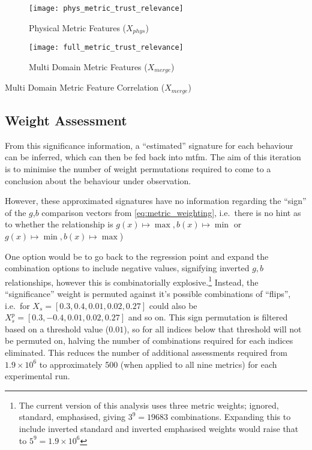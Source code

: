 \begin{figure}[h!]
  \centering
  \texttt{[image: phys\_metric\_trust\_relevance]}
  \caption{Physical Metric Features ($X_{phys}$)}
  \label{fig:phys_feature_extraction}
\end{figure}

\begin{figure}[h!]
  \centering
  \texttt{[image: full\_metric\_trust\_relevance]}
  \caption{Multi Domain  Metric Features ($X_{merge}$)}
  \label{fig:multi_feature_extraction}
\end{figure}

\begin{table}
  \centering
  \caption{Multi Domain Metric Feature Correlation ($X_{merge}$)}
  
  \label{tab:full_metric_correlations}
\end{table}



\subsection{Weight Assessment}\label{sec:weight_assessment}

From this significance information, a ``estimated'' signature for each behaviour can be inferred, which can then be fed back into \gls{mtfm}. 
The aim of this iteration is to minimise the number of weight permutations required to come to a conclusion about the behaviour under observation. 

However, these approximated signatures have no information regarding the ``sign'' of the  $g$,$b$ comparison vectors from \autoref{eq:metric_weighting}, i.e.\ there is no hint as to whether the relationship is $g(x) \mapsto \max, b(x) \mapsto \min$ or $g(x) \mapsto \min, b(x) \mapsto \max$)  

One option would be to go back to the regression point and expand the combination options to include negative values, signifying inverted $g,b$ relationships, however this is combinatorially explosive.\footnote{The current version of this analysis uses three metric weights; ignored, standard, emphasised, giving $3^9 = 19683$ combinations. Expanding this to include inverted standard and inverted emphasised weights would raise that to $5^9 = 1.9\times 10^6$}
Instead, the ``significance'' weight is permuted against it's possible combinations of ``flips'', i.e.\ for $X_s=[0.3,0.4,0.01,0.02,0.27]$ could also be $X_s^p=[0.3,-0.4,0.01,0.02,0.27]$ and so on. 
This sign permutation is filtered based on a threshold value ($0.01$), so for all indices below that threshold will not be permuted on, halving the number of combinations required for each indices eliminated.
This reduces the number of additional assessments required from $1.9\times 10^6$ to approximately 500 (when applied to all nine metrics) for each experimental run.

